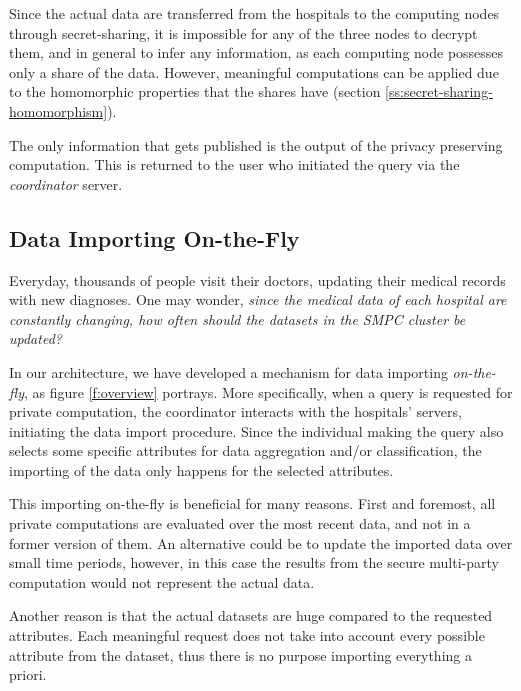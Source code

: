 Since the actual data are transferred from the hospitals to the computing nodes through secret\hyp sharing, it is impossible for any of the three nodes to decrypt them, and in general to infer any information, as each computing node possesses only a share of the data.
However, meaningful computations can be applied due to the homomorphic properties that the shares have (section \ref{ss:secret-sharing-homomorphism}).

The only information that gets published is the output of the privacy preserving computation.
This is returned to the user who initiated the query via the \textit{coordinator} server.






\subsection{Data Importing On-the-Fly}\label{s:importing-otf}
Everyday, thousands of people visit their doctors, updating their medical records with new diagnoses.
One may wonder, \textit{since the medical data of each hospital are constantly changing, how often should the datasets in the SMPC cluster be updated?}

In our architecture, we have developed a mechanism for data importing \textit{on-the-fly}, as figure \ref{f:overview} portrays.
More specifically, when a query is requested for private computation, the coordinator interacts with the hospitals' servers, initiating the data import procedure.
Since the individual making the query also selects some specific attributes for data aggregation and/or classification, the importing of the data only happens for the selected attributes.

This importing on-the-fly is beneficial for many reasons.
First and foremost, all private computations are evaluated over the most recent data, and not in a former version of them.
An alternative could be to update the imported data over small time periods, however, in this case the results from the secure multi-party computation would not represent the actual data.

Another reason is that the actual datasets are huge compared to the requested attributes.
Each meaningful request does not take into account every possible attribute from the dataset, thus there is no purpose importing everything a priori.


